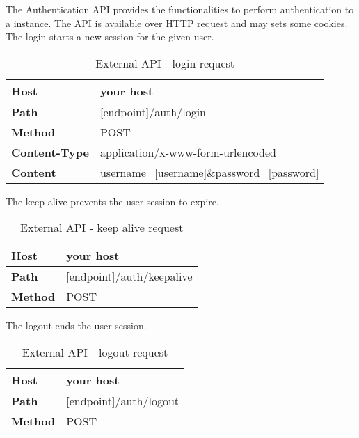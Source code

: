         The Authentication API provides the functionalities to perform authentication to a  instance. The API is available over HTTP request and may sets some cookies.
            The login starts a new session for the given user. \\
            \begin{table}[H]
                \centering
                \begin{tabu}{|l|l|}
                    \hline
                    \textbf{Host} & your host \\ \hline
                    \textbf{Path} & [endpoint]/auth/login \\ \hline
                    \textbf{Method} & POST \\ \hline
                    \textbf{Content-Type} & application/x-www-form-urlencoded \\ \hline
                    \textbf{Content} & username=[username]\&password=[password] \\ \hline
                \end{tabu}
                \caption{External API - login request}
            \end{table}
            The keep alive prevents the user session to expire. \\
            \begin{table}[H]
                \centering
                \begin{tabu}{|l|l|}
                    \hline
                    \textbf{Host} & your host \\ \hline
                    \textbf{Path} & [endpoint]/auth/keepalive \\ \hline
                    \textbf{Method} & POST \\ \hline
                \end{tabu}
                \caption{External API - keep alive request}
            \end{table}
            The logout ends the user session. \\
            \begin{table}[H]
                \centering
                \begin{tabu}{|l|l|}
                    \hline
                    \textbf{Host} & your host \\ \hline
                    \textbf{Path} & [endpoint]/auth/logout \\ \hline
                    \textbf{Method} & POST \\ \hline
                \end{tabu}
                \caption{External API - logout request}
            \end{table}